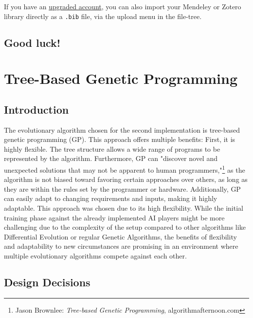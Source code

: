 \documentclass[sigconf]{acmart} %
\begin{document}
If you have an \href{https://www.overleaf.com/user/subscription/plans}{upgraded account}, you can also import your Mendeley or Zotero library directly as a \verb|.bib| file, via the upload menu in the file-tree.

\subsection{Good luck!}

\section{Tree-Based Genetic Programming}
\subsection{Introduction}
 
The evolutionary algorithm chosen for the second implementation is tree-based genetic programming (GP). This approach offers multiple benefits: 
First, it is highly flexible. The tree structure allows a wide range of programs to be represented by the algorithm. 
Furthermore, GP can "discover novel and unexpected solutions that may not be apparent to human programmers,"\footnote{Jason Brownlee: \textit{Tree-based Genetic Programming}, algorithmafternoon.com} as the algorithm is not biased toward favoring certain approaches over others, as long as they are within the rules set by the programmer or hardware. 
Additionally, GP can easily adapt to changing requirements and inputs, making it highly adaptable. 
This approach was chosen due to its high flexibility. While the initial training phase against the already implemented AI players might be more challenging due to the complexity of the setup compared to other algorithms like Differential Evolution or regular Genetic Algorithms, the benefits of flexibility and adaptability to new circumstances are promising in an environment where multiple evolutionary algorithms compete against each other. 

\subsection{Design Decisions}
\end{document}
